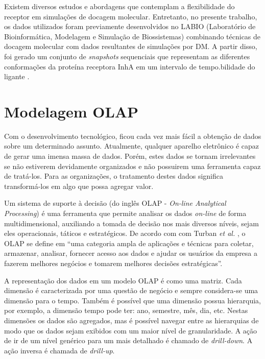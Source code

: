 Existem diversos estudos e abordagens que contemplam a flexibilidade do receptor em simulações de docagem molecular. Entretanto, no presente trabalho, os dados utilizados foram previamente desenvolvidos no LABIO (Laboratório de Bioinformática, Modelagem e Simulação de Biossistemas) combinando técnicas de docagem molecular com dados resultantes de simulações por DM. A partir disso, foi gerado um conjunto de \emph{snapshots} sequenciais que representam as diferentes conformações da proteína receptora InhA em um intervalo de tempo.bilidade do ligante \cite{kar11}.

\section{Modelagem OLAP}

Com o desenvolvimento tecnológico, ficou cada vez mais fácil a obtenção de dados sobre um determinado assunto. Atualmente, qualquer aparelho eletrônico é capaz de gerar uma imensa massa de dados. Porém, estes dados se tornam irrelevantes se não estiverem devidamente organizados e não possuirem uma ferramenta capaz de tratá-los. Para as organizações, o tratamento destes dados significa transformá-los em algo que possa agregar valor.

Um sistema de suporte à decisão (do inglês OLAP - \emph{On-line Analytical Processing}) é uma ferramenta que permite analisar os dados \emph{on-line} de forma multidimensional, auxiliando a tomada de decisão nos mais diversos níveis, sejam eles operacionais, táticos e estratégicos. De acordo com com Turban \emph{et al.} \cite{TUR05}, o OLAP se define em “uma categoria ampla de aplicações e técnicas para coletar, armazenar, analisar, fornecer acesso aos dados e ajudar os usuários da empresa a fazerem melhores negócios e tomarem melhores decisões estratégicas”. 

A representação dos dados em um modelo OLAP é como uma matriz. Cada dimensão é caracterizada por uma questão de negócio e sempre considera-se uma dimensão para o tempo. Também é possível que uma dimensão possua hierarquia, por exemplo, a dimensão tempo pode ter: ano, semestre, mês, dia, etc. Nestas dimensões os dados são agregados, mas é possível navegar entre as hierarquias de modo que os dados sejam exibidos com um maior nível de granularidade. A ação de ir de um nível genérico para um mais detalhado é chamado de \emph{drill-down}. A ação inversa é chamada de \emph{drill-up}.


